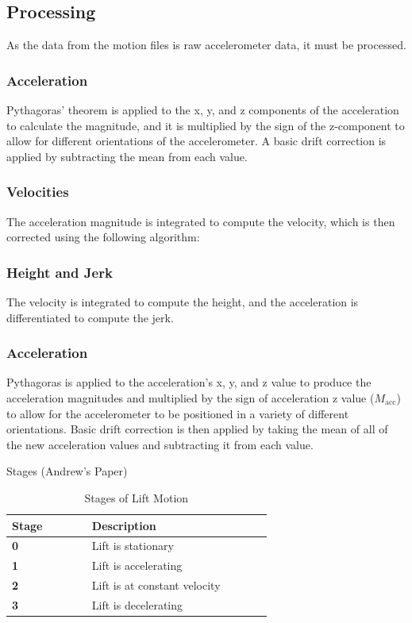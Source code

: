 \documentclass[12pt,a4paper]{article}
\begin{document}
\subsection{Processing}
As the data from the motion files is raw accelerometer data, it must be processed. 

\subsubsection{Acceleration}
Pythagoras’ theorem is applied to the x, y, and z components of the acceleration to calculate the magnitude, and it is multiplied by the sign of the z-component to allow for different orientations of the accelerometer. A basic drift correction is applied by subtracting the mean from each value.

\subsubsection{Velocities}
The acceleration magnitude is integrated to compute the velocity, which is then corrected using the following algorithm:



\subsubsection{Height and Jerk}
The velocity is integrated to compute the height, and the acceleration is differentiated to compute the jerk.
\subsubsection{Acceleration}
Pythagoras is applied to the acceleration's x, y, and z value to produce the acceleration magnitudes and multiplied by the sign of acceleration z value ($M_{\text{acc}}$) to allow for the accelerometer to be positioned in a variety of different orientations. Basic drift correction is then applied by taking the mean of all of the new acceleration values and subtracting it from each value. 

Stages
(Andrew's Paper)

\begin{table}[H]
\centering
\begin{tabular}{|p{0.2\linewidth}|p{0.45\linewidth}|} 
\hline
 \textbf{Stage} & \textbf{Description} \\ \hline
 \textbf{0} & Lift is stationary \\ \hline
 \textbf{1} & Lift is accelerating \\ \hline
 \textbf{2} & Lift is at constant velocity \\ \hline
 \textbf{3} & Lift is decelerating \\ \hline
\end{tabular}
\caption{Stages of Lift Motion}
\end{table}
\end{document}
